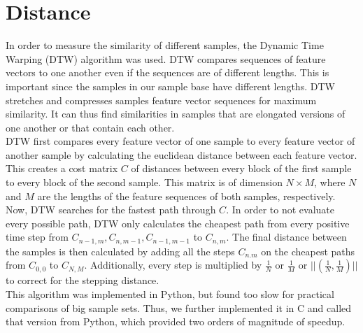 \section{Distance}
\label{sec:Distance}

In order to measure the similarity of different samples, the Dynamic Time Warping (DTW) algorithm was used. DTW compares sequences of feature vectors to one another even if the sequences are of different lengths. This is important since the samples in our sample base have different lengths. DTW stretches and compresses samples feature vector sequences for maximum similarity. It can thus find similarities in samples that are elongated versions of one another or that contain each other.\\
DTW first compares every feature vector of one sample to every feature vector of another sample by calculating the euclidean distance between each feature vector. This creates a cost matrix $C$ of distances between every block of the first sample to every block of the second sample. This matrix is of dimension $N \times M$, where $N$ and $M$ are the lengths of the feature sequences of both samples, respectively.\\
Now, DTW searches for the fastest path through $C$. In order to not evaluate every possible path, DTW only calculates the cheapest path from every positive time step from $C_{n-1,m}, C_{n,m-1}, C_{n-1,m-1}$ to $C_{n,m}$. The final distance between the samples is then calculated by adding all the steps $C_{n.m}$ on the cheapest paths from $C_{0,0}$ to $C_{N,M}$. Additionally, every step is multiplied by $\frac{1}{N}$ or $\frac{1}{M}$ or $||(\frac{1}{N},\frac{1}{M})||$ to correct for the stepping distance.\\
This algorithm was implemented in Python, but found too slow for practical comparisons of big sample sets. Thus, we further implemented it in C and called that version from Python, which provided two orders of magnitude of speedup.
